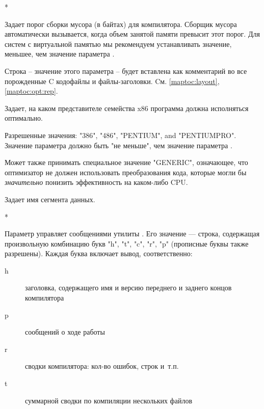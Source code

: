 \begin{description}
        \MLBegin{}*\MLEnd{}

Задает порог сборки мусора (в байтах) для компилятора.
Сборщик мусора автоматически вызывается, когда объем занятой памяти превысит
этот порог. Для систем с виртуальной памятью мы рекомендуем устанавливать
значение, меньшее, чем значение параметра
        .

\ifgenc
{}
        \MLBegin{}\ModeC{}\MLEnd{}

Строка -- значение этого параметра -- будет вставлена как комментарий
во все порожденные C кодофайлы и файлы-заголовки.
Cм. \ref{maptoc:layout}, \ref{maptoc:opt:rep}.
\fi

\ifgencode
{}
        \MLBegin{}\ModeC{}\MLEnd{}

Задает, на каком представителе семейства x86 
программа должна исполняться оптимально.

Разрешенные значения: "386", "486", "PENTIUM", and "PENTIUMPRO".
Значение параметра должно быть "не меньше", чем значение параметра
.

Может также принимать специальное значение "GENERIC", 
означающее, что оптимизатор не должен использовать преобразования кода,
которые могли бы 
{\it значительно} понизить эффективность на каком-либо CPU.
\fi

\ifgencode
{}
        \MLBegin{}\ModeC{}\MLEnd{} \header

Задает имя сегмента данных.
\fi

        \MLBegin{}*\MLEnd{}

Параметр управляет сообщениями утилиты \XC{}. Его значение ---
строка, содержащая произвольную комбинацию букв
"h", "t", "c", "r", "p" (прописные буквы также разрешены).
Каждая буква включает вывод, соответственно:
        \begin{description}
        \item[h]
заголовка, содержащего имя и версию переднего и заднего 
концов компилятора
        \item[p]
сообщений о ходе работы
        \item[r]
сводки компилятора: кол-во ошибок, строк и~т.п.
        \item[t]
суммарной сводки по компиляции нескольких файлов
        \end{description}


\end{description}
